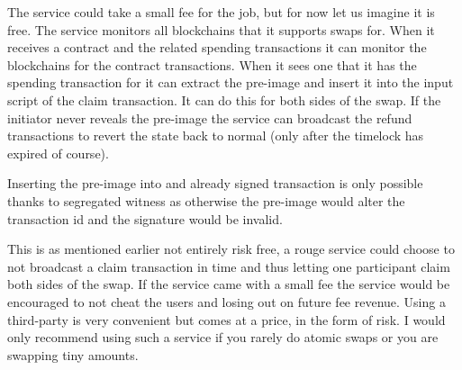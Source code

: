 The service could take a small fee for the job, but for now let us imagine it is free. The service monitors all blockchains that it supports swaps for. When it receives a contract and the related spending transactions it can monitor the blockchains for the contract transactions. When it sees one that it has the spending transaction for it can extract the pre-image and insert it into the input script of the claim transaction. It can do this for both sides of the swap. If the initiator never reveals the pre-image the service can broadcast the refund transactions to revert the state back to normal (only after the timelock has expired of course). 

Inserting the pre-image into and already signed transaction is only possible thanks to segregated witness as otherwise the pre-image would alter the transaction id and the signature would be invalid. 

This is as mentioned earlier not entirely risk free, a rouge service could choose to not broadcast a claim transaction in time and thus letting one participant claim both sides of the swap. If the service came with a small fee the service would be encouraged to not cheat the users and losing out on future fee revenue. Using a third-party is very convenient but comes at a price, in the form of risk. I would only recommend using such a service if you rarely do atomic swaps or you are swapping tiny amounts.